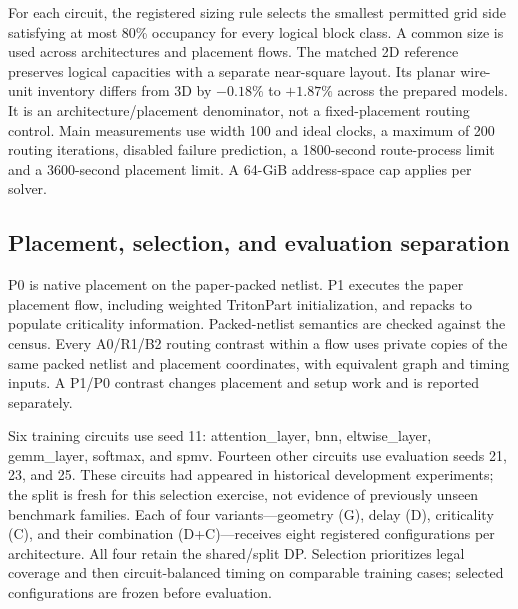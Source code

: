 \documentclass[conference,10pt]{IEEEtran}
\begin{document}
For each circuit, the registered sizing rule selects the smallest permitted grid side satisfying at most 80\% occupancy for every logical block class. A common size is used across architectures and placement flows. The matched 2D reference preserves logical capacities with a separate near-square layout. Its planar wire-unit inventory differs from 3D by $-0.18\%$ to $+1.87\%$ across the prepared models. It is an architecture/placement denominator, not a fixed-placement routing control. Main measurements use width 100 and ideal clocks, a maximum of 200 routing iterations, disabled failure prediction, a 1800-second route-process limit and a 3600-second placement limit. A 64-GiB address-space cap applies per solver.

\subsection{Placement, selection, and evaluation separation}
P0 is native placement on the paper-packed netlist. P1 executes the paper placement flow, including weighted TritonPart initialization, and repacks to populate criticality information. Packed-netlist semantics are checked against the census. Every A0/R1/B2 routing contrast within a flow uses private copies of the same packed netlist and placement coordinates, with equivalent graph and timing inputs. A P1/P0 contrast changes placement and setup work and is reported separately.

Six training circuits use seed 11: attention\_layer, bnn, eltwise\_layer, gemm\_layer, softmax, and spmv. Fourteen other circuits use evaluation seeds 21, 23, and 25. These circuits had appeared in historical development experiments; the split is fresh for this selection exercise, not evidence of previously unseen benchmark families. Each of four variants---geometry (G), delay (D), criticality (C), and their combination (D+C)---receives eight registered configurations per architecture. All four retain the shared/split DP. Selection prioritizes legal coverage and then circuit-balanced timing on comparable training cases; selected configurations are frozen before evaluation.
\end{document}
